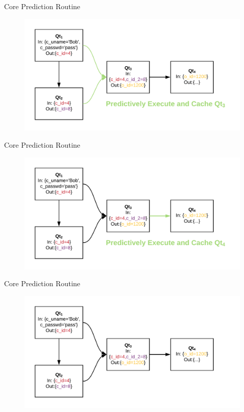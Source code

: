\documentclass[12pt]{beamer}
\begin{document}
\begin{frame}[fragile]{Core Prediction Routine}
    \begin{figure}
        \hspace*{-1cm}
        \includegraphics[scale=0.22]{apollo_cpr_4}
    \end{figure}
\end{frame}

\begin{frame}[fragile]{Core Prediction Routine}
    \begin{figure}
        \hspace*{-1cm}
        \includegraphics[scale=0.22]{apollo_cpr_5}
    \end{figure}
\end{frame}

\begin{frame}[fragile]{Core Prediction Routine}
    \begin{figure}
        \hspace*{-1cm}
        \includegraphics[scale=0.22]{apollo_cpr}
    \end{figure}
\end{frame}
\end{document}
